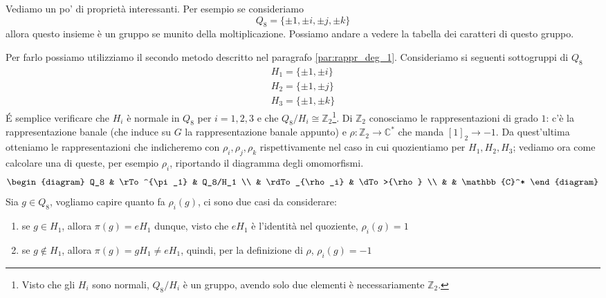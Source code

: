 \documentclass[11pt]{article}
\theoremstyle{plain}
\theoremstyle{definition}
\theoremstyle{remark}
\newcommand{\C}{\mathbb{C}}
\newcommand{\Z}{\mathbb{Z}}
\newcommand{\tridiag}[6]{
	  \begin{diagram}
	  #1 & \rTo^{#2}  & #3        \\
	     & \rdTo_{#6} & \dTo>{#4}   \\
	     &          & #5
	  \end{diagram}
}
\begin{document}
Vediamo un po' di proprietà interessanti. Per esempio se consideriamo
\[ Q_8 =  \{\pm 1, \pm i, \pm j, \pm k \}\]
allora questo insieme è un gruppo se munito della moltiplicazione. Possiamo andare a vedere la tabella dei caratteri di questo gruppo.

Per farlo possiamo utilizziamo il secondo metodo descritto nel paragrafo \eqref{par:rappr_deg_1}. Consideriamo si seguenti sottogruppi di $Q_8$
\begin{align*}
	H_1=\{ \pm1, \pm i \}\\
	H_2=\{ \pm1, \pm j \}\\
	H_3=\{ \pm1, \pm k \}
\end{align*}
\'E semplice verificare che $H_i$ è normale in $Q_8$ per $i=1,2,3$ e che $Q_8/H_i\cong \Z_2$\footnote{Visto che gli $H_i$ sono normali, $Q_8/H_i$ è un gruppo, avendo solo due elementi è necessariamente $\Z_2$.}. Di $\Z_2$ conosciamo le rappresentazioni di grado $1$: c'è la rappresentazione banale (che induce su $G$ la rappresentazione banale appunto) e $\rho:\Z_2\to \C^*$ che manda $[1]_2\to -1$. Da quest'ultima otteniamo le rappresentazioni che indicheremo con $\rho_i, \rho_j, \rho_k$ rispettivamente nel caso in cui quozientiamo per $H_1, H_2, H_3$; vediamo ora come calcolare una di queste, per esempio $\rho_i$, riportando il diagramma degli omomorfismi.
\[\tridiag {Q_8} {\pi_1} {Q_8/H_1} \rho {\C^*} {\rho_i}\]
Sia $g\in Q_8$, vogliamo capire quanto fa $\rho_i(g)$, ci sono due casi da considerare:
\begin{enumerate}
	\item se $g\in H_1$, allora $\pi(g) = eH_1$ dunque, visto che $eH_1$ è l'identità nel quoziente, $\rho_i(g)=1$
	\item se $g\not\in H_1$, allora $\pi(g) =gH_1\neq eH_1$, quindi, per la definizione di $\rho$, $\rho_i(g)=-1$
\end{enumerate}
\end{document}
